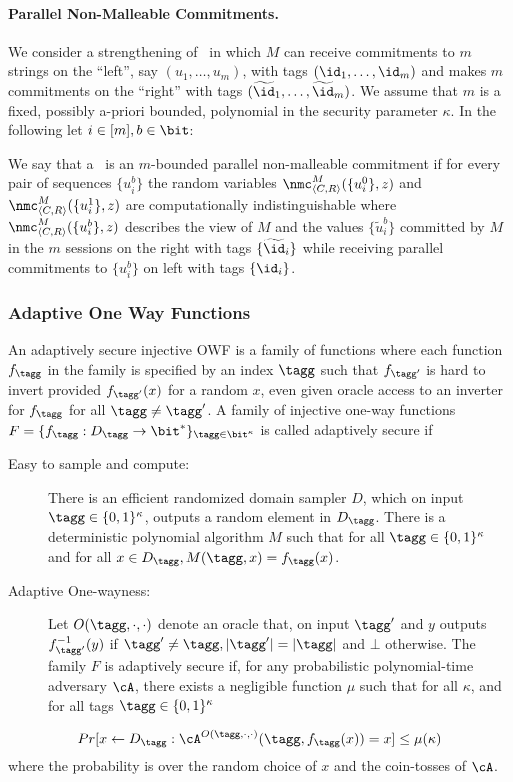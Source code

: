   \ED

  \paragraph{Parallel Non-Malleable Commitments.} We consider a
  strengthening of \nmcom\ in which $M$ can receive commitments to $m$
  strings on the ``left'', say $(u_1,\ldots,u_m)$, with tags $(\id_1,
  \ldots,\id_m)$ and makes $m$ commitments on the ``right'' with tags
  $(\widetilde{\id}_1,\ldots,\widetilde{\id}_m)$. We assume that $m$
  is a fixed, possibly a-priori bounded, polynomial in the security
  parameter $\kappa$. In the following let $i\in[m],b\in\bit$:

  We say that a \nmcom\ is an $m$-bounded parallel non-malleable
  commitment if for every pair of sequences $\{u^b_i\}$ the random
  variables $\nmc^{M}_{\langle C,R\rangle}(\{u^0_i\}, z)$ and
  $\nmc^{M}_{\langle C,R\rangle}(\{u^1_i\}, z)$ are computationally
  indistinguishable where $\nmc^{M}_{\langle C,R\rangle}(\{u_i^b\}, z)$
  describes the view of $M$ and the values $\{\widetilde{u}_i^b\}$
  committed by $M$ in the $m$ sessions on the right with tags
  $\{\widetilde{\id}_i\}$ while receiving parallel commitments to
  $\{u^b_i\}$ on left with tags $\{\id_i\}$.

  \subsubsection{Adaptive One Way Functions}

  An adaptively secure injective OWF is a family of functions where each
  function $f_\tagg$ in the family is specified by an index $\tagg$ such
  that  $f_{\tagg'}$ is hard to invert provided $f_{\tagg'}(x)$ for a
  random $x$, even  given oracle access to an inverter for $f_{\tagg}$
  for all $\tagg \neq \tagg'$.   A family of injective one-way
  functions $F = \{f_\tagg: D_\tagg \rightarrow\bit^*
  \}_{\tagg\in\bit^\kappa}$ is called adaptively secure if
  \begin{description}
  \item[Easy to sample and compute:] There is an efficient randomized
   domain sampler $D$, which on input $\tagg \in \{0, 1\}^\kappa$,
   outputs a random element in $D_\tagg$. There is a deterministic
   polynomial algorithm $M$ such that for all $\tagg \in \{0,
   1\}^\kappa$ and for all $x \in D_\tagg, M(\tagg, x) = f_\tagg(x)$.
  \item [Adaptive One-wayness:] Let $O(\tagg, \cdot, \cdot)$ denote an
   oracle that, on input $\tagg'$ and $y$ outputs $f^{-1}_{\tagg'}(y)$
   if $\tagg' \neq \tagg, |\tagg' | = |\tagg|$ and $\bot$ otherwise.
   The family $F$ is adaptively secure if, for any probabilistic
   polynomial-time adversary $\cA$, there exists a negligible function
   $\mu$ such that for all $\kappa$, and for all tags $\tagg \in \{0,
   1\}^\kappa$ \end{description}
  $$Pr[x \leftarrow D_\tagg : \cA^{O(\tagg,\cdot,\cdot)}(\tagg,
   f_\tagg(x)) = x] \leq\mu(\kappa)$$ where the probability is over the
  random choice of $x$ and the coin-tosses of $\cA$.
  \ED

